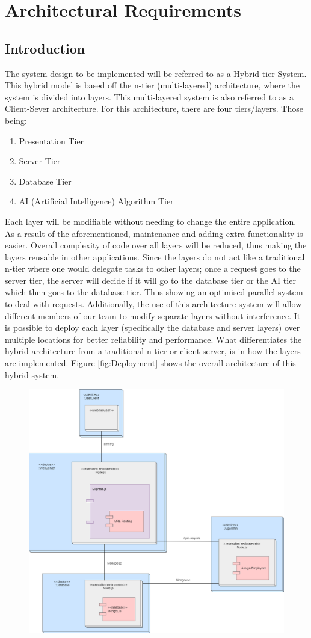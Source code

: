 \documentclass[a4paper,12pt]{article}
\begin{document}
	\section{Architectural Requirements}
		\begin{adjustwidth}{2.5em}{0pt}
			\subsection{Introduction}
			\begin{flushleft}
				The system design to be implemented will be referred to as a Hybrid-tier System. This hybrid model is based off the n-tier (multi-layered) architecture, where the system is divided into layers. This multi-layered system is also referred to as a Client-Sever architecture. For this architecture, there are four tiers/layers. Those being: 
				\begin{enumerate}
					\item Presentation Tier
					\item Server Tier
					\item Database Tier
					\item AI (Artificial Intelligence) Algorithm Tier
				\end{enumerate}
				 Each layer will be modifiable without needing to change the entire application. As a result of the aforementioned, maintenance and adding extra functionality is easier. Overall complexity of code over all layers will be reduced, thus making the layers reusable in other applications. Since the layers do not act like a traditional n-tier where one would delegate tasks to other layers; once a request goes to the server tier, the server will decide if it will go to the database tier or the AI tier which then goes to the database tier. Thus showing an optimised parallel system to deal with requests.
				 Additionally, the use of this architecture system will allow different members of our team to modify separate layers without interference. It is possible to deploy each layer (specifically the database and server layers) over multiple locations for better reliability and performance. What differentiates the hybrid architecture from a traditional n-tier or client-server, is in how the layers are implemented. Figure \ref{fig:Deployment} shows the overall architecture of this hybrid system.
				 	\begin{figure}[h]
					 	\centering
				    	\includegraphics[width=0.5\linewidth]{Diagrams/deployment.png}

\end{figure}
\end{flushleft}
\end{adjustwidth}
\end{document}
